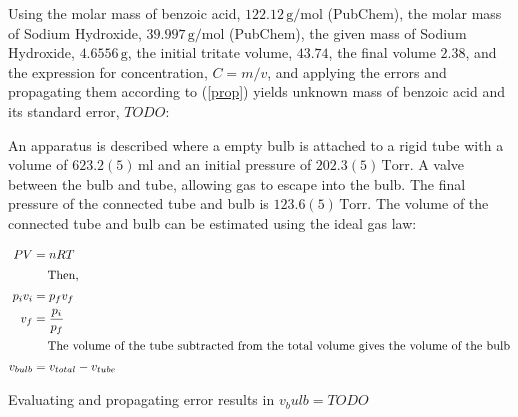 Using the molar mass of benzoic acid, $122.12 \, \si{\gram \per \mol}$ (PubChem), the molar mass of Sodium Hydroxide, $39.997 \, \si{\gram \per \mol}$ (PubChem), the given mass of Sodium Hydroxide, $4.6556 \, \si{\gram}$, the initial tritate volume, $43.74$, the final volume $2.38$, and the expression for concentration, $C = m/v$, and applying the errors and propagating them according to (\ref{prop}) yields unknown mass of benzoic acid and its standard error, $TODO$:


An apparatus is described where a empty bulb is attached to a rigid tube with a volume of $623.2(5) \, \si{\ml}$ and an initial pressure of $202.3(5) \, \text{Torr}$.  A valve between the bulb and tube, allowing gas to escape into the bulb.  The final pressure of the connected tube and bulb is $123.6(5) \, \text{Torr}$.  The volume of the connected tube and bulb can be estimated using the ideal gas law:

\begin{align}
    PV & = nRT \\
    \intertext{\hspace{1cm} Then,}
    p_i v_i & = p_f v_f \\
    v_f & = \frac{p_i}{p_f} \\
    \intertext{\hspace{1cm} The volume of the tube subtracted from the total volume gives the volume of the bulb}
    v_{bulb} & = v_{total} - v_{tube}
\end{align}

Evaluating and propagating error results in $v_bulb = TODO$


